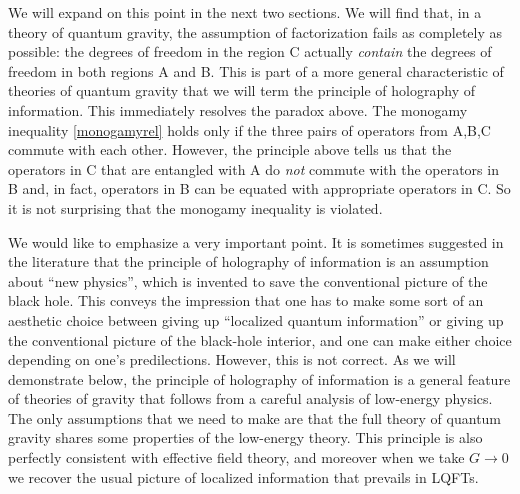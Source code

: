 \documentclass[12pt]{article}
\def\gnewt{G}
\begin{document}
We will expand on this point in the next two sections. We will find that, in a theory of quantum gravity, the assumption of factorization fails as completely as possible: the degrees of freedom in the region C actually {\em contain} the degrees of freedom in both regions A and B. This is part of a more general characteristic of theories of quantum gravity that we will term the principle of holography of information. This immediately resolves the paradox above. The monogamy inequality \eqref{monogamyrel} holds only if the three pairs of operators from A,B,C commute with each other. However, the principle above tells us that the operators in C that are entangled with A do {\em not} commute with the operators in B and, in fact, operators in B can be equated with appropriate operators in C.  So it is not surprising that the monogamy inequality is violated.

We would like to emphasize a very important point. It is sometimes suggested in the literature \cite{Mathur:2017fnw} that the principle of holography of information is an assumption about ``new physics'', which is invented to save the conventional picture of the black hole. This conveys the impression that one has to make some sort of an aesthetic choice between giving up ``localized quantum information'' or giving up the conventional picture of the black-hole interior, and one can make either choice depending on one's predilections.  However, this is not correct.  As we will demonstrate below, the principle of holography of information is a general feature of theories of gravity that  follows from a careful analysis of low-energy physics. The only assumptions
that we need to make are that the full theory of quantum gravity shares some properties of the low-energy theory. This principle is also perfectly consistent with effective field theory, and moreover when we take $\gnewt \rightarrow 0$ we recover the usual picture of localized information that prevails in LQFTs.
\end{document}
